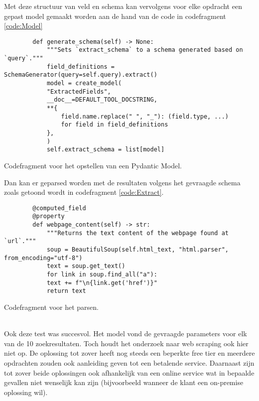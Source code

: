 Met deze structuur van veld en schema kan vervolgens voor elke opdracht een gepast model gemaakt worden aan de hand van de code in codefragment \ref{code:Model}
\begin{listing}
    \begin{verbatim}
        def generate_schema(self) -> None:
            """Sets `extract_schema` to a schema generated based on `query`."""
            field_definitions = SchemaGenerator(query=self.query).extract()
            model = create_model(
            "ExtractedFields",
            __doc__=DEFAULT_TOOL_DOCSTRING,
            **{
                field.name.replace(" ", "_"): (field.type, ...)
                for field in field_definitions
            },
            )
            self.extract_schema = list[model]
    \end{verbatim}
    \caption[Model codefragment]{Codefragment voor het opstellen van een Pydantic Model.}
    \label{code:Model}
\end{listing}
Dan kan er geparsed worden met de resultaten volgens het gevraagde schema zoals getoond wordt in codefragment \ref{code:Extract}.
\begin{listing}
    \begin{verbatim}
        @computed_field
        @property
        def webpage_content(self) -> str:
            """Returns the text content of the webpage found at `url`."""
            soup = BeautifulSoup(self.html_text, "html.parser", from_encoding="utf-8")
            text = soup.get_text()
            for link in soup.find_all("a"):
            text += f"\n{link.get('href')}"
            return text
    \end{verbatim}
    \caption[Extract codefragment]{Codefragment voor het parsen.}
    \label{code:Extract}
\end{listing}
\\
Ook deze test was succesvol. Het model vond de gevraagde parameters voor elk van de 10 zoekresultaten. Toch houdt het onderzoek naar web scraping ook hier niet op. De oplossing tot zover heeft nog steeds een beperkte free tier en meerdere opdrachten zouden ook aanleiding geven tot een betalende service.
Daarnaast zijn tot zover beide oplossingen ook afhankelijk van een online service wat in bepaalde gevallen niet wenselijk kan zijn (bijvoorbeeld wanneer de klant een on-premise oplossing wil).
